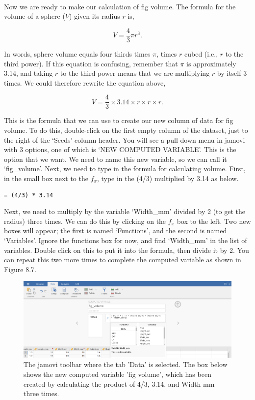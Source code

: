 \documentclass[
  openany]{scrbook}
\begin{document}
\begin{verbatim}




\end{verbatim}

Now we are ready to make our calculation of fig volume.
The formula for the volume of a sphere (\(V\)) given its radius \(r\) is,

\[V = \frac{4}{3} \pi r^{3}.\]

In words, sphere volume equals four thirds times \(\pi\), times \(r\) cubed (i.e., \(r\) to the third power).
If this equation is confusing, remember that \(\pi\) is approximately 3.14, and taking \(r\) to the third power means that we are multiplying \(r\) by itself 3 times.
We could therefore rewrite the equation above,

\[V = \frac{4}{3} \times 3.14 \times r \times r \times r.\]

This is the formula that we can use to create our new column of data for fig volume.
To do this, double-click on the first empty column of the dataset, just to the right of the `Seeds' column header.
You will see a pull down menu in jamovi with 3 options, one of which is `NEW COMPUTED VARIABLE'.
This is the option that we want.
We need to name this new variable, so we can call it `fig\_volume'.
Next, we need to type in the formula for calculating volume.
First, in the small box next to the \(f_{x}\), type in the (4/3) multiplied by 3.14 as below.

\begin{verbatim}
= (4/3) * 3.14
\end{verbatim}

Next, we need to multiply by the variable `Width\_mm' divided by 2 (to get the radius) three times.
We can do this by clicking on the \(f_{x}\) box to the left.
Two new boxes will appear; the first is named `Functions', and the second is named `Variables'.
Ignore the functions box for now, and find `Width\_mm' in the list of variables.
Double click on this to put it into the formula, then divide it by 2.
You can repeat this two more times to complete the computed variable as shown in Figure 8.7.

\begin{figure}
\includegraphics[width=1\linewidth]{img/jamovi_compute_new_variable} \caption{The jamovi toolbar where the tab 'Data' is selected. The box below shows the new computed variable 'fig volume', which has been created by calculating the product of 4/3, 3.14, and Width mm three times.}\label{fig:unnamed-chunk-31}
\end{figure}
\end{document}
